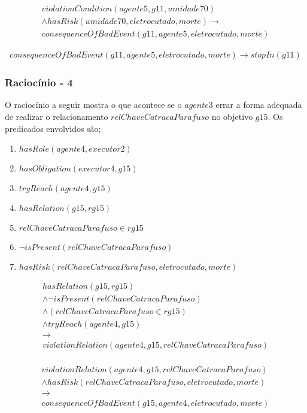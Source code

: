 \begin{eqnarray} \nonumber
	violationCondition(agente5,g11,umidade70) \nonumber \\
	\wedge hasRisk(umidade70,eletrocutado,morte) \to \nonumber \\  
	consequenceOfBadEvent(g11,agente5,eletrocutado,morte)
\end{eqnarray}


\begin{eqnarray}
	consequenceOfBadEvent(g11,agente5,eletrocutado,morte) \to stopIn(g11)
\end{eqnarray}
\subsubsection{Raciocínio - 4} 

O raciocínio a seguir mostra o que acontece se o $agente3$ errar a forma adequada de realizar o relacionamento $relChaveCatracaParafuso$ no objetivo $g15$. Os predicados envolvidos são;

\begin{enumerate}
	\item $hasRole(agente4,executor2)$
	\item $hasObligation(executor4,g15)$	
	\item $tryReach(agente4,g15)$ 
	\item $hasRelation(g15,rg15)$
	\item $relChaveCatracaParafuso \in rg15$	
	\item $\neg isPresent(relChaveCatracaParafuso)$
	\item $hasRisk(relChaveCatracaParafuso,eletrocutado,morte)$
\end{enumerate}

\begin{eqnarray}
	hasRelation(g15,rg15) \nonumber \\
	\wedge \neg isPresent(relChaveCatracaParafuso)  \nonumber \\ 
	\wedge (relChaveCatracaParafuso \in rg15) \nonumber \\
	\wedge tryReach(agente4,g15) \nonumber \\ 
	\to \nonumber \\ 
	violationRelation(agente4,g15,relChaveCatracaParafuso) \nonumber \\
\end{eqnarray}

\begin{eqnarray}\nonumber
	violationRelation(agente4,g15,relChaveCatracaParafuso) \nonumber \\ 
	 \wedge hasRisk(relChaveCatracaParafuso,eletrocutado,morte) \nonumber \\ 
	\to \nonumber \\ 
	consequenceOfBadEvent(g15,agente4,eletrocutado,morte)
\end{eqnarray}

